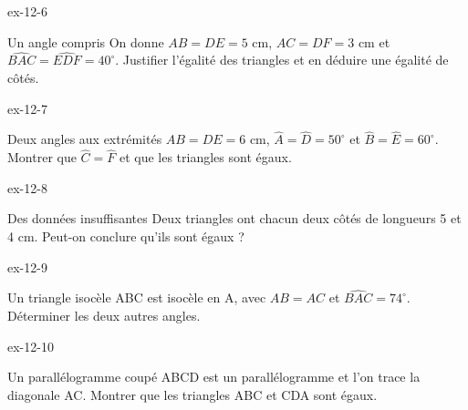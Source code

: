 \begin{blocLivre}{ex-12-6}\begin{exercice}[2]{Un angle compris}
On donne $AB=DE=5$ cm, $AC=DF=3$ cm et $\widehat{BAC}=\widehat{EDF}=40^\circ$. Justifier l’égalité des triangles et en déduire une égalité de côtés.
\label{fig-ex-12-6}
\end{exercice}\end{blocLivre}
\begin{blocLivre}{ex-12-7}\begin{exercice}[2]{Deux angles aux extrémités}
$AB=DE=6$ cm, $\widehat A=\widehat D=50^\circ$ et $\widehat B=\widehat E=60^\circ$. Montrer que $\widehat C=\widehat F$ et que les triangles sont égaux.
\label{fig-ex-12-7}
\end{exercice}\end{blocLivre}
\begin{blocLivre}{ex-12-8}\begin{exercice}[2]{Des données insuffisantes}
Deux triangles ont chacun deux côtés de longueurs 5 et 4 cm. Peut-on conclure qu’ils sont égaux ?
\label{fig-ex-12-8}
\end{exercice}\end{blocLivre}
\begin{blocLivre}{ex-12-9}\begin{exercice}[2]{Un triangle isocèle}
ABC est isocèle en A, avec $AB=AC$ et $\widehat{BAC}=74^\circ$. Déterminer les deux autres angles.
\label{fig-ex-12-9}
\end{exercice}\end{blocLivre}
\begin{blocLivre}{ex-12-10}\begin{exercice}[2]{Un parallélogramme coupé}
ABCD est un parallélogramme et l’on trace la diagonale AC. Montrer que les triangles ABC et CDA sont égaux.
\label{fig-ex-12-10}
\end{exercice}\end{blocLivre}

